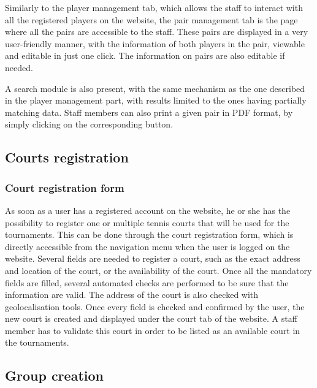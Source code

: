 Similarly to the player management tab, which allows the staff to interact with
all the registered players on the website, the pair management tab is the page
where all the pairs are accessible to the staff. These pairs are displayed in a
very user-friendly manner, with the information of both players in the
pair, viewable and editable in just one click. The information on pairs are
also editable if needed. \newline

A search module is also present, with the same mechanism as the one described
in the player management part, with results limited to the ones having partially
matching data. Staff members can also print a given pair in PDF format,
by simply clicking on the corresponding button.

\subsection{Courts registration}
\label{sub:Courts registration}

\subsubsection{Court registration form}
\label{subs:Court registration form}

As soon as a user has a registered account on the website,
he or she has the possibility to register one or multiple tennis courts that
will be used for the tournaments. This can be done through the court
registration form, which is directly accessible from the navigation menu
when the user is logged on the website. Several fields are needed to register
a court, such as the exact address and location of the court, or the
availability of the court. Once all the mandatory fields are filled, several
automated checks are performed to be sure that the information are valid.
The address of the court is also checked with geolocalisation tools.
Once every field is checked and confirmed by the user, the new court is
created and displayed under the court tab of the website. A staff member
has to validate this court in order to be listed as an available court
in the tournaments.

\subsection{Group creation}
\label{sub:Group creation}

